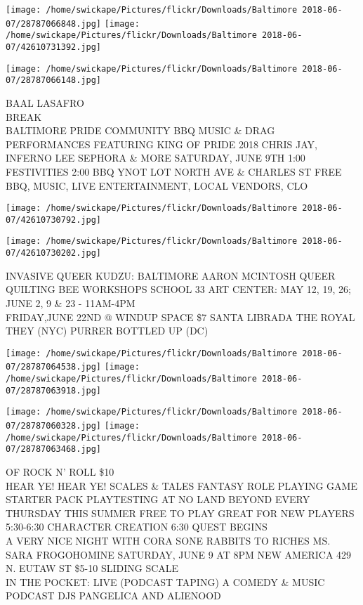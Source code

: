 \documentclass[10pt,letterpaper]{article}
\begin{document}
\texttt{[image: /home/swickape/Pictures/flickr/Downloads/Baltimore 2018-06-07/28787066848.jpg]}
\texttt{[image: /home/swickape/Pictures/flickr/Downloads/Baltimore 2018-06-07/42610731392.jpg]}

\vspace{0.25in}
\texttt{[image: /home/swickape/Pictures/flickr/Downloads/Baltimore 2018-06-07/28787066148.jpg]}

BAAL LASAFRO\\
BREAK\\
BALTIMORE PRIDE COMMUNITY BBQ MUSIC \& DRAG PERFORMANCES FEATURING KING OF PRIDE 2018 CHRIS JAY, INFERNO LEE SEPHORA \& MORE SATURDAY, JUNE 9TH 1:00 FESTIVITIES 2:00 BBQ YNOT LOT NORTH AVE \& CHARLES ST FREE BBQ, MUSIC, LIVE ENTERTAINMENT, LOCAL VENDORS, CLO
\pagebreak

\texttt{[image: /home/swickape/Pictures/flickr/Downloads/Baltimore 2018-06-07/42610730792.jpg]}

\vspace{0.25in}
\texttt{[image: /home/swickape/Pictures/flickr/Downloads/Baltimore 2018-06-07/42610730202.jpg]}

INVASIVE QUEER KUDZU: BALTIMORE AARON MCINTOSH QUEER QUILTING BEE WORKSHOPS SCHOOL 33 ART CENTER: MAY 12, 19, 26; JUNE 2, 9 \& 23 {-} 11AM{-}4PM\\
FRIDAY,JUNE 22ND @ WINDUP SPACE \$7 SANTA LIBRADA THE ROYAL THEY (NYC) PURRER BOTTLED UP (DC)
\pagebreak

\texttt{[image: /home/swickape/Pictures/flickr/Downloads/Baltimore 2018-06-07/28787064538.jpg]}
\texttt{[image: /home/swickape/Pictures/flickr/Downloads/Baltimore 2018-06-07/28787063918.jpg]}

\texttt{[image: /home/swickape/Pictures/flickr/Downloads/Baltimore 2018-06-07/28787060328.jpg]}
\texttt{[image: /home/swickape/Pictures/flickr/Downloads/Baltimore 2018-06-07/28787063468.jpg]}

OF ROCK N' ROLL \$10\\
HEAR YE!  HEAR YE!  SCALES \& TALES FANTASY ROLE PLAYING GAME STARTER PACK PLAYTESTING AT NO LAND BEYOND EVERY THURSDAY THIS SUMMER FREE TO PLAY GREAT FOR NEW PLAYERS 5:30{-}6:30 CHARACTER CREATION 6:30 QUEST BEGINS\\
A VERY NICE NIGHT WITH CORA SONE RABBITS TO RICHES MS. SARA FROGOHOMINE SATURDAY, JUNE 9 AT 8PM NEW AMERICA 429 N. EUTAW ST \$5{-}10 SLIDING SCALE\\
IN THE POCKET: LIVE (PODCAST TAPING) A COMEDY \& MUSIC PODCAST DJS PANGELICA AND ALIENOOD
\pagebreak
\end{document}
